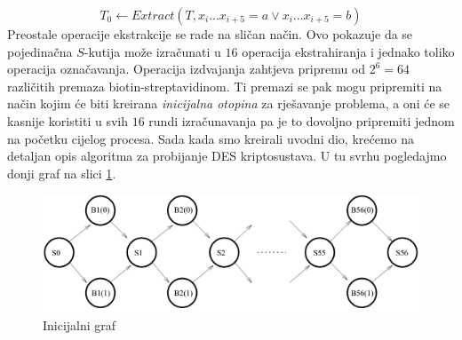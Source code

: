 \documentclass[a4paper,oneside,12pt]{memoir} %
\begin{document}
\begin{spacing}{1.5}
\[T_0 \leftarrow Extract(T, x_i...x_{i+5}=a \vee x_i...x_{i+5}=b)\]
Preostale operacije ekstrakcije se rade na sličan način. Ovo pokazuje da se pojedinačna $S$-kutija može izračunati u $16$ operacija ekstrahiranja i jednako toliko operacija označavanja.	Operacija izdvajanja zahtjeva pripremu od $2^6=64$ različitih premaza biotin-streptavidinom. Ti premazi se pak mogu pripremiti na način kojim će biti kreirana \textit{inicijalna otopina}  za rješavanje problema, a oni će se kasnije koristiti u svih $16$ rundi izračunavanja pa je to dovoljno pripremiti jednom na početku cijelog procesa. Sada kada smo kreirali uvodni dio, krećemo na detaljan opis algoritma za probijanje DES kriptosustava. U tu svrhu pogledajmo donji graf na slici \ref{fig:graf}.
\begin{figure}[h]
\centering \includegraphics[scale=0.5]{graf.png}
\caption{Inicijalni graf}
\label{fig:graf}
\end{figure}


\end{spacing}
\end{document}
